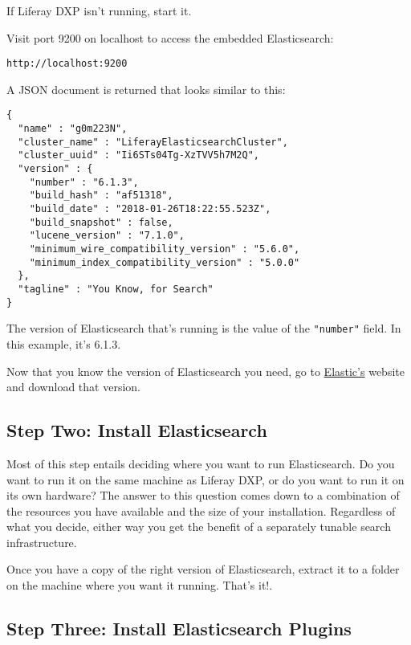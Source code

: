 If Liferay DXP isn't running, start it.

Visit port 9200 on localhost to access the embedded Elasticsearch:

\begin{verbatim}
http://localhost:9200
\end{verbatim}

A JSON document is returned that looks similar to this:

\begin{verbatim}
{
  "name" : "g0m223N",
  "cluster_name" : "LiferayElasticsearchCluster",
  "cluster_uuid" : "Ii6STs04Tg-XzTVV5h7M2Q",
  "version" : {
    "number" : "6.1.3",
    "build_hash" : "af51318",
    "build_date" : "2018-01-26T18:22:55.523Z",
    "build_snapshot" : false,
    "lucene_version" : "7.1.0",
    "minimum_wire_compatibility_version" : "5.6.0",
    "minimum_index_compatibility_version" : "5.0.0"
  },
  "tagline" : "You Know, for Search"
}
\end{verbatim}

The version of Elasticsearch that's running is the value of the
\texttt{"number"} field. In this example, it's 6.1.3.

Now that you know the version of Elasticsearch you need, go to
\href{https://www.elastic.co}{Elastic's} website and download that
version.

\subsection{Step Two: Install
Elasticsearch}\label{step-two-install-elasticsearch-1}

Most of this step entails deciding where you want to run Elasticsearch.
Do you want to run it on the same machine as Liferay DXP, or do you want
to run it on its own hardware? The answer to this question comes down to
a combination of the resources you have available and the size of your
installation. Regardless of what you decide, either way you get the
benefit of a separately tunable search infrastructure.

Once you have a copy of the right version of Elasticsearch, extract it
to a folder on the machine where you want it running. That's it!.

\subsection{Step Three: Install Elasticsearch
Plugins}\label{step-three-install-elasticsearch-plugins-1}

